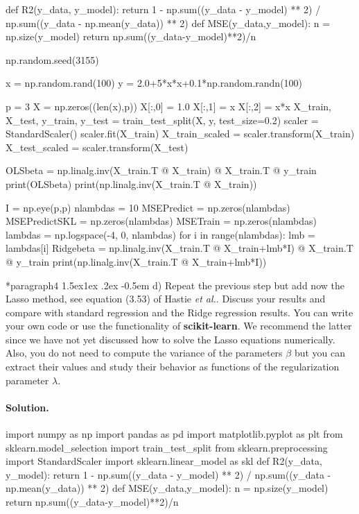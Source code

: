 \documentclass[%
oneside,                 %
final,                   %
10pt]{article}
\makeatletter
\newenvironment{doconceexercise}{}{}
\newcommand\subex{\@startsection*{paragraph}{4}{\z@}%
                  {1.5ex\@plus1ex \@minus.2ex}%
                  {-0.5em}%
                  {\normalfont\normalsize\bfseries}}
\makeatother
\begin{document}
\begin{doconceexercise}
def R2(y_data, y_model):
    return 1 - np.sum((y_data - y_model) ** 2) / np.sum((y_data - np.mean(y_data)) ** 2)
def MSE(y_data,y_model):
    n = np.size(y_model)
    return np.sum((y_data-y_model)**2)/n


np.random.seed(3155)

x = np.random.rand(100)
y = 2.0+5*x*x+0.1*np.random.randn(100)

p = 3
X = np.zeros((len(x),p))
X[:,0] = 1.0
X[:,1] = x
X[:,2] = x*x
X_train, X_test, y_train, y_test = train_test_split(X, y, test_size=0.2)
scaler = StandardScaler()
scaler.fit(X_train)
X_train_scaled = scaler.transform(X_train)
X_test_scaled = scaler.transform(X_test)

OLSbeta = np.linalg.inv(X_train.T @ X_train) @ X_train.T @ y_train
print(OLSbeta)
print(np.linalg.inv(X_train.T @ X_train))

I = np.eye(p,p)
nlambdas = 10
MSEPredict = np.zeros(nlambdas)
MSEPredictSKL = np.zeros(nlambdas)
MSETrain = np.zeros(nlambdas)
lambdas = np.logspace(-4, 0, nlambdas)
for i in range(nlambdas):
    lmb = lambdas[i]
    Ridgebeta = np.linalg.inv(X_train.T @ X_train+lmb*I) @ X_train.T @ y_train
    print(np.linalg.inv(X_train.T @ X_train+lmb*I))

\subex{d)}
Repeat the previous step but add now the Lasso method, see equation (3.53) of Hastie \emph{et al.}. Discuss your results and compare with standard regression and the Ridge regression results. You can write your own code or use the functionality of \textbf{scikit-learn}.  We recommend the latter since we have not yet discussed how to solve the Lasso equations numerically. Also, you do not need to compute the variance of the parameters $\beta$ but you can extract their values and study their behavior as functions of the regularization parameter $\lambda$.


\paragraph{Solution.}
import numpy as np
import pandas as pd
import matplotlib.pyplot as plt
from sklearn.model_selection import train_test_split
from sklearn.preprocessing import StandardScaler
import sklearn.linear_model as skl
def R2(y_data, y_model):
    return 1 - np.sum((y_data - y_model) ** 2) / np.sum((y_data - np.mean(y_data)) ** 2)
def MSE(y_data,y_model):
    n = np.size(y_model)
    return np.sum((y_data-y_model)**2)/n



\end{doconceexercise}
\end{document}
